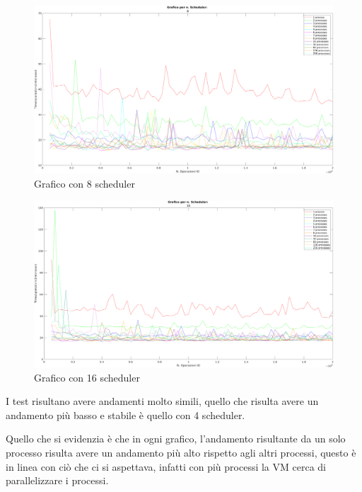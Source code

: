 \begin{figure}[!htp]
    \centering
    \includegraphics[keepaspectratio=true,scale=0.33]{images/matlab/concorrenza_io/8_IO.png}
	\caption{Grafico con 8 scheduler}
  	\label{fig:8_schedulerIO}
\end{figure}

\begin{figure}[!htp]
    \centering
    \includegraphics[keepaspectratio=true,scale=0.33]{images/matlab/concorrenza_io/16_IO.png}
	\caption{Grafico con 16 scheduler}
  	\label{fig:16_schedulerIO}
\end{figure}

I test risultano avere andamenti molto simili, quello che risulta
avere un andamento più basso e stabile
è quello con 4 scheduler.

Quello che si evidenzia è che in ogni grafico, l'andamento
risultante da un solo processo risulta avere un andamento più alto
rispetto agli altri processi, questo è in linea con ciò che
ci si aspettava, infatti con più processi la VM cerca di parallelizzare
i processi.

